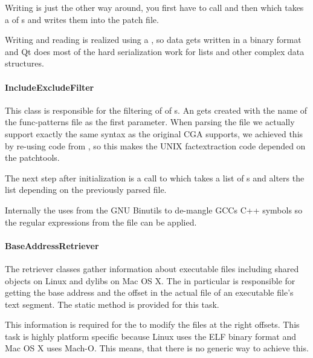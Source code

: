 Writing is just the other way around, you first have to call  and then  which takes a  of s and writes them into the patch file.

Writing and reading is realized using a , so data gets written in a binary format and Qt does most of the hard serialization work for lists and other complex data structures.

\paragraph{IncludeExcludeFilter}

This class is responsible for the filtering of  of s.   An  gets created with the name of the func-patterns file as the first parameter.  When parsing the file we actually support exactly the same syntax as the original CGA supports, we achieved this by re-using code from , so this makes the UNIX factextraction code depended on the patchtools.

The next step after initialization is a call to  which takes a list of s and alters the list depending on the previously parsed file.

Internally the  uses  from the GNU Binutils to de-mangle GCCs C++ symbols so the regular expressions from the file can be applied.

\paragraph{BaseAddressRetriever}

The retriever classes gather information about executable files including shared objects on Linux and dylibs on Mac OS X.  The  in particular is responsible for getting the base address and the offset in the actual file of an executable file's text segment.  The static method  is provided for this task.

This information is required for the  to modify the files at the right offsets.  This task is highly platform specific because Linux uses the ELF binary format and Mac OS X uses Mach-O. This means, that there is no generic way to achieve this.

